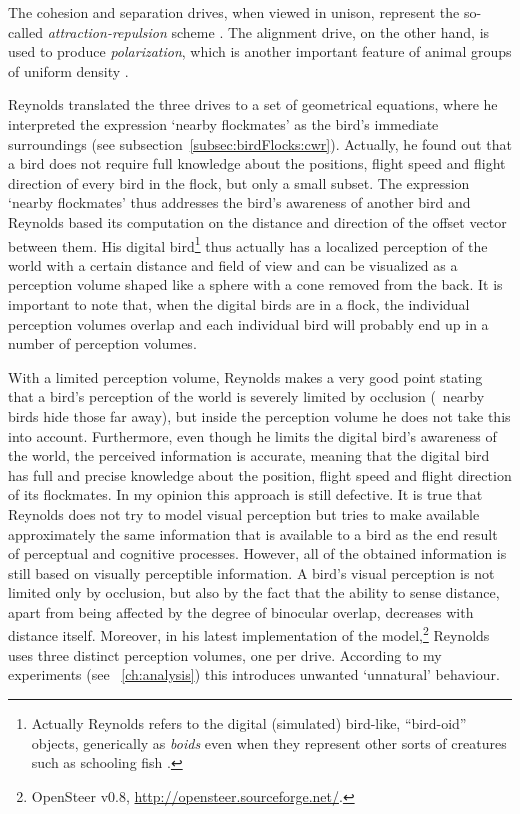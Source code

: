 The cohesion and separation drives, when viewed in unison, represent the so-called \emph{attraction-repulsion} scheme \cite{okubo:1980}. The alignment drive, on the other hand, is used to produce \emph{polarization}, which is another important feature of animal groups of uniform density \cite{parrish:1997a}.

Reynolds translated the three drives to a set of geometrical equations, where he interpreted the expression `nearby flockmates' as the bird's immediate surroundings (see subsection~\ref{subsec:birdFlocks:cwr}). Actually, he found out that a bird does not require full knowledge about the positions, flight speed and flight direction of every bird in the flock, but only a small subset. The expression `nearby flockmates' thus addresses the bird's awareness of another bird and Reynolds based its computation on the distance and direction of the offset vector between them. His digital bird\footnote{Actually Reynolds refers to the digital (simulated) bird-like, ``bird-oid'' objects, generically as \emph{boids} even when they represent other sorts of creatures such as schooling fish \cite{reynolds:1987}.} thus actually has a localized perception of the world with a certain distance and field of view and can be visualized as a perception volume shaped like a sphere with a cone removed from the back. It is important to note that, when the digital birds are in a flock, the individual perception volumes overlap and each individual bird will probably end up in a number of perception volumes.

With a limited perception volume, Reynolds makes a very good point stating that a bird's perception of the world is severely limited by occlusion (\ie\ nearby birds hide those far away), but inside the perception volume he does not take this into account. Furthermore, even though he limits the digital bird's awareness of the world, the perceived information is accurate, meaning that the digital bird has full and precise knowledge about the position, flight speed and flight direction of its flockmates. In my opinion this approach is still defective. It is true that Reynolds does not try to model visual perception but tries to make available approximately the same information that is available to a bird as the end result of perceptual and cognitive processes. However, all of the obtained information is still based on visually perceptible information. A bird's visual perception is not limited only by occlusion, but also by the fact that the ability to sense distance, apart from being affected by the degree of binocular overlap, decreases with distance itself. Moreover, in his latest implementation of the model,\footnote{OpenSteer v0.8, \href{http://opensteer.sourceforge.net/}{http://opensteer.sourceforge.net/}.} Reynolds uses three distinct perception volumes, one per drive. According to my experiments (see \chaptername~\ref{ch:analysis}) this introduces unwanted `unnatural' behaviour.

